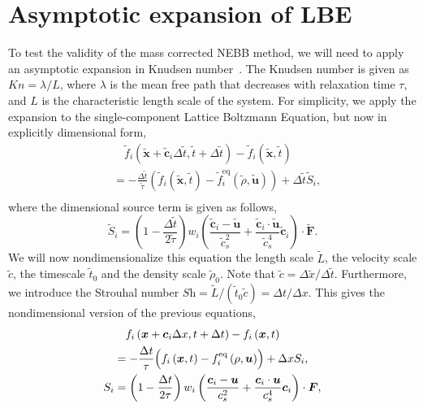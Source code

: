 \documentclass[fleqn,a4paper]{article} %
\numberwithin{equation}{section} %
\numberwithin{figure}{section} %
\numberwithin{table}{section} %
\numberwithin{algorithm}{section} %
\begin{document}
\section{Asymptotic expansion of LBE}
To test the validity of the mass corrected NEBB method, we will need to apply an asymptotic expansion in Knudsen number~\cite{inamuro_accuracy_1997}. The Knudsen number is given as $\textit{Kn} = \lambda / L$, where $\lambda$ is the mean free path that decreases with relaxation time $\tau$, and $L$ is the characteristic length scale of the system. For simplicity, we apply the expansion to the single-component Lattice Boltzmann Equation, but now in explicitly dimensional form,
\begin{equation}
\begin{split}
    &\quad\tilde{f}_i\left(\tilde{\bm{x}} + \tilde{\bm{c}}_i \Delta \tilde{t}, \tilde{t} + \Delta \tilde{t}\right) - \tilde{f}_i\left(\tilde{\bm{x}}, \tilde{t}\right)\\
    &= -\frac{\Delta \tilde{t}}{\tilde{\tau}}\left(\tilde{f}_i\left(\tilde{\bm{x}}, \tilde{t}\right)  - \tilde{f}^\text{eq}_i\left(\tilde{\rho}, \tilde{\bm{u}}\right)\right) + \Delta \tilde{t} \tilde{S}_i,\\
\end{split}
\end{equation}
where the dimensional source term is given as follows,
\begin{equation}
    \tilde{S}_i =  \left(1 - \frac{\Delta \tilde{t}}{2\tilde{\tau}}\right)w_i \left(\frac{\tilde{\bm{c}}_i - \tilde{\bm{u}}}{\tilde{c}_s^2} + \frac{\tilde{\bm{c}}_i \cdot \tilde{\bm{u}}}{\tilde{c}_s^4}\tilde{\bm{c}}_i\right) \cdot \tilde{\bm{F}}.
\end{equation}
We will now nondimensionalize this equation the length scale $\tilde{L}$, the velocity scale $\tilde{c}$, the timescale $\tilde{t}_0$ and the density scale $\tilde{\rho}_0$. Note that $\tilde{c} = \Delta \tilde{x} / \Delta \tilde{t}$. Furthermore, we introduce the Strouhal number $\textit{Sh} = \tilde{L} / (\tilde{t}_0 \tilde{c}) = \Delta t / \Delta x$. This gives the nondimensional version of the previous equations,
\begin{equation}
\begin{split}
    &\quad f_i\left(\bm{x} + \bm{c}_i \Delta x, t + \Delta t\right) - f_i\left(\bm{x}, t\right)\\
    &= -\frac{\Delta t}{\tau}\Bigl(f_i\left(\bm{x}, t\right)  - f^\text{eq}_i\left(\rho, \bm{u}\right)\Bigr) + \Delta x S_i,\\
    S_i &=  \left(1 - \frac{\Delta t}{2\tau}\right)w_i \left(\frac{\bm{c}_i - \bm{u}}{c_s^2} + \frac{\bm{c}_i \cdot \bm{u}}{c_s^4}\bm{c}_i\right) \cdot \bm{F},
\end{split}
\end{equation}
\end{document}

